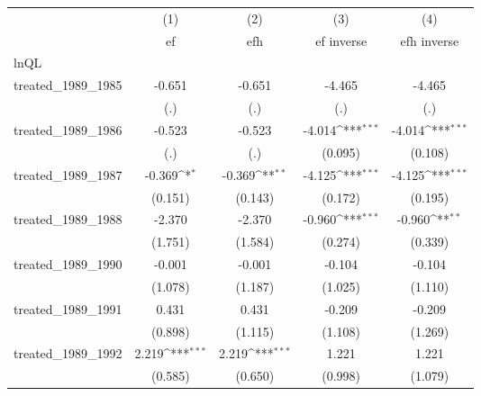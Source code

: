 {
\def\sym#1{\ifmmode^{#1}\else\(^{#1}\)\fi}
\begin{tabular}{l*{4}{c}}
\hline\hline
            &\multicolumn{1}{c}{(1)}&\multicolumn{1}{c}{(2)}&\multicolumn{1}{c}{(3)}&\multicolumn{1}{c}{(4)}\\
            &\multicolumn{1}{c}{ef}&\multicolumn{1}{c}{efh}&\multicolumn{1}{c}{ef inverse}&\multicolumn{1}{c}{efh inverse}\\
\hline
lnQL        &                     &                     &                     &                     \\
treated\_1989\_1985&      -0.651         &      -0.651         &      -4.465         &      -4.465         \\
            &         (.)         &         (.)         &         (.)         &         (.)         \\
[1em]
treated\_1989\_1986&      -0.523         &      -0.523         &      -4.014\sym{***}&      -4.014\sym{***}\\
            &         (.)         &         (.)         &     (0.095)         &     (0.108)         \\
[1em]
treated\_1989\_1987&      -0.369\sym{*}  &      -0.369\sym{**} &      -4.125\sym{***}&      -4.125\sym{***}\\
            &     (0.151)         &     (0.143)         &     (0.172)         &     (0.195)         \\
[1em]
treated\_1989\_1988&      -2.370         &      -2.370         &      -0.960\sym{***}&      -0.960\sym{**} \\
            &     (1.751)         &     (1.584)         &     (0.274)         &     (0.339)         \\
[1em]
treated\_1989\_1990&      -0.001         &      -0.001         &      -0.104         &      -0.104         \\
            &     (1.078)         &     (1.187)         &     (1.025)         &     (1.110)         \\
[1em]
treated\_1989\_1991&       0.431         &       0.431         &      -0.209         &      -0.209         \\
            &     (0.898)         &     (1.115)         &     (1.108)         &     (1.269)         \\
[1em]
treated\_1989\_1992&       2.219\sym{***}&       2.219\sym{***}&       1.221         &       1.221         \\
            &     (0.585)         &     (0.650)         &     (0.998)         &     (1.079)         \\

\end{tabular}}
